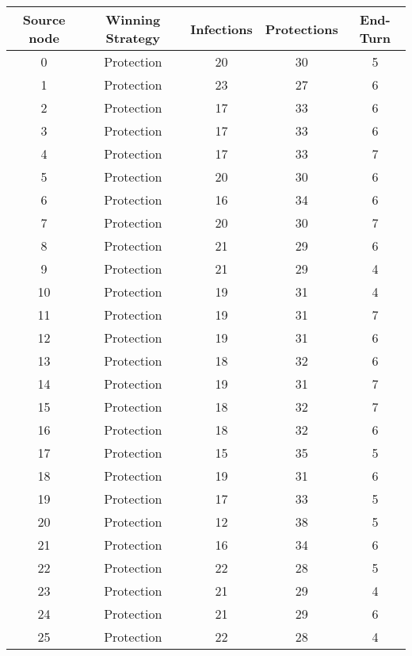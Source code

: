 \documentclass[results.tex]{subfiles}
\begin{document}
\begin{center}
  \begin{tabular}{| c || c | c | c | c |}
    \hline
    {\bfseries Source node} & {\bfseries Winning Strategy} & {\bfseries Infections} & {\bfseries Protections} & {\bfseries End-Turn} \\  %
    \hline\hline
    0 & Protection & 20 & 30 & 5 \\ 
    \hline
    1 & Protection & 23 & 27 & 6 \\ 
    \hline
    2 & Protection & 17 & 33 & 6 \\ 
    \hline
    3 & Protection & 17 & 33 & 6 \\ 
    \hline
    4 & Protection & 17 & 33 & 7 \\ 
    \hline
    5 & Protection & 20 & 30 & 6 \\ 
    \hline
    6 & Protection & 16 & 34 & 6 \\ 
    \hline
    7 & Protection & 20 & 30 & 7 \\ 
    \hline
    8 & Protection & 21 & 29 & 6 \\ 
    \hline
    9 & Protection & 21 & 29 & 4 \\ 
    \hline
    10 & Protection & 19 & 31 & 4 \\ 
    \hline
    11 & Protection & 19 & 31 & 7 \\ 
    \hline
    12 & Protection & 19 & 31 & 6 \\ 
    \hline
    13 & Protection & 18 & 32 & 6 \\ 
    \hline
    14 & Protection & 19 & 31 & 7 \\ 
    \hline
    15 & Protection & 18 & 32 & 7 \\ 
    \hline
    16 & Protection & 18 & 32 & 6 \\ 
    \hline
    17 & Protection & 15 & 35 & 5 \\ 
    \hline
    18 & Protection & 19 & 31 & 6 \\ 
    \hline
    19 & Protection & 17 & 33 & 5 \\ 
    \hline
    20 & Protection & 12 & 38 & 5 \\ 
    \hline
    21 & Protection & 16 & 34 & 6 \\ 
    \hline
    22 & Protection & 22 & 28 & 5 \\ 
    \hline
    23 & Protection & 21 & 29 & 4 \\ 
    \hline
    24 & Protection & 21 & 29 & 6 \\ 
    \hline
    25 & Protection & 22 & 28 & 4 \\ 

\end{tabular}
\end{center}
\end{document}
